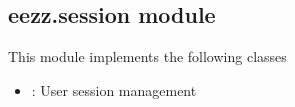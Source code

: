 \documentclass[letterpaper,10pt,english]{sphinxmanual}
\begin{document}
\subsection{eezz.session module}
\label{\detokenize{eezz:module-eezz.session}}\label{\detokenize{eezz:eezz-session-module}}
\sphinxAtStartPar
This module implements the following classes
\begin{itemize}
\item {} 
\sphinxAtStartPar
{}: User session management

\end{itemize}
\end{document}
